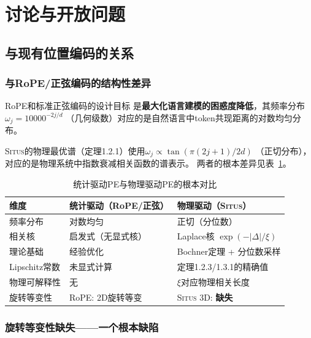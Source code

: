 \documentclass[11pt,a4paper]{article}
\theoremstyle{remark}
\newcommand{\Situs}{\textsc{Situs}}
\begin{document}
\section{讨论与开放问题}

\subsection{与现有位置编码的关系}

\subsubsection{与RoPE/正弦编码的结构性差异}

RoPE\cite{su2024roformer}和标准正弦编码\cite{vaswani2017attention}的设计目标
是\textbf{最大化语言建模的困惑度降低}，其频率分布$\omega_j = 10000^{-2j/d}$
（几何级数）对应的是自然语言中token共现距离的对数均匀分布。

\Situs{}的物理最优谱（定理1.2.1）使用$\omega_j \propto \tan(\pi(2j+1)/2d)$
（正切分布），对应的是物理系统中指数衰减相关函数的谱表示。
两者的根本差异见表~\ref{tab:comparison}。

\begin{table}[htbp]
\centering
\caption{统计驱动PE与物理驱动PE的根本对比}
\label{tab:comparison}
\begin{tabular}{@{}p{3.5cm}ll@{}}
\toprule
\textbf{维度} & \textbf{统计驱动（RoPE/正弦）} & \textbf{物理驱动（\Situs{}）} \\
\midrule
频率分布 & 对数均匀 & 正切（分位数） \\
相关核 & 启发式（无显式核） & Laplace核 $\exp(-|\Delta|/\xi)$ \\
理论基础 & 经验优化 & Bochner定理 + 分位数采样 \\
Lipschitz常数 & 未显式计算 & 定理1.2.3/1.3.1的精确值 \\
物理可解释性 & 无 & $\xi$对应物理相关长度 \\
旋转等变性 & RoPE: 2D旋转等变 & \Situs{} 3D: \textbf{缺失} \\
\bottomrule
\end{tabular}
\end{table}

\subsubsection{旋转等变性缺失——一个根本缺陷}
\end{document}
